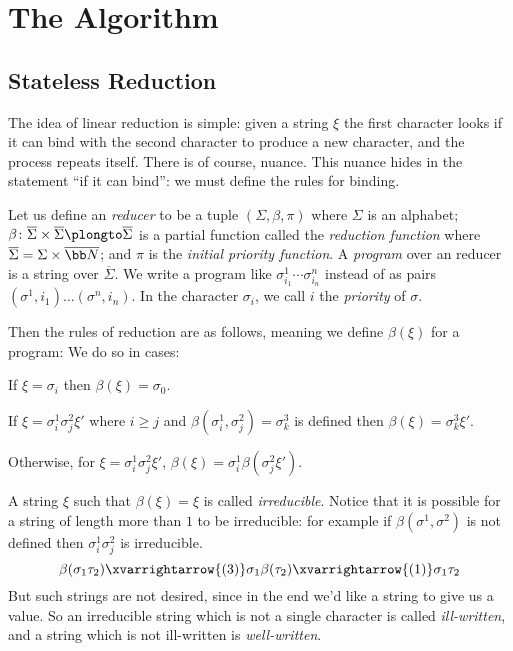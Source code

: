 \section{The Algorithm}

\subsection{Stateless Reduction}

The idea of linear reduction is simple: given a string $\xi$ the first character looks if it can bind with the second character to produce a new character, and the process repeats itself.
There is of course, nuance.
This nuance hides in the statement ``if it can bind'': we must define the rules for binding.

Let us define an {\it reducer} to be a tuple $(\Sigma,\beta,\pi)$ where $\Sigma$ is an alphabet; $\beta\colon\overline\Sigma\times\overline\Sigma\plongto\overline\Sigma$ is a partial function called the
{\it reduction function} where $\overline\Sigma=\Sigma\times\overline{\bb N}$; and $\pi$ is the {\it initial priority function}.
A {\it program} over an reducer is a string over $\overline\Sigma$.
We write a program like $\sigma^1_{i_1}\cdots\sigma^n_{i_n}$ instead of as pairs $(\sigma^1,i_1)\dots(\sigma^n,i_n)$.
In the character $\sigma_i$, we call $i$ the {\it priority} of $\sigma$.

Then the rules of reduction are as follows, meaning we define $\beta(\xi)$ for a program:
We do so in cases:
\benum
    \item If $\xi=\sigma_i$ then $\beta(\xi)=\sigma_0$.
    \item If $\xi=\sigma^1_i\sigma^2_j\xi'$ where $i\geq j$ and $\beta(\sigma^1_i,\sigma^2_j)=\sigma^3_k$ is defined then $\beta(\xi)=\sigma^3_k\xi'$.
    \item Otherwise, for $\xi=\sigma^1_i\sigma^2_j\xi'$, $\beta(\xi)=\sigma^1_i\beta(\sigma^2_j\xi')$.
\eenum

A string $\xi$ such that $\beta(\xi)=\xi$ is called {\it irreducible}.
Notice that it is possible for a string of length more than $1$ to be irreducible: for example if $\beta(\sigma^1,\sigma^2)$ is not defined then $\sigma^1_i\sigma^2_j$ is irreducible.
$$ \beta(\sigma_1\tau_2)\xvarrightarrow{(3)}\sigma_1\beta(\tau_2)\xvarrightarrow{(1)}\sigma_1\tau_2 $$
But such strings are not desired, since in the end we'd like a string to give us a value.
So an irreducible string which is not a single character is called {\it ill-written}, and a string which is not ill-written is {\it well-written}.

